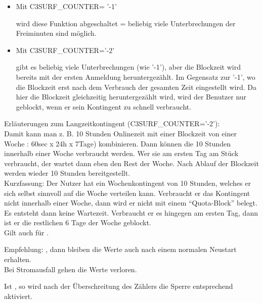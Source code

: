 \begin{itemize}
\begin{description}
\begin{itemize}
    \item{Mit C3SURF\_COUNTER= '-1'}
    
    wird diese Funktion abgeschaltet = beliebig viele Unterbrechungen der Freiminuten
    sind möglich.

    \item{Mit C3SURF\_COUNTER='-2'}
    
    gibt es beliebig viele Unterbrechungen (wie '-1'), aber die Blockzeit wird
    bereits mit der ersten Anmeldung heruntergezählt. Im Gegensatz zur '-1', wo die
    Blockzeit erst nach dem Verbrauch der gesamten Zeit eingestellt wird.
    Da hier die Blockzeit gleichzeitig heruntergezählt wird, wird der Benutzer nur geblockt,
    wenn er sein Kontingent zu schnell verbraucht.
  \end{itemize}
  
   Erläuterungen zum Langzeitkontingent (C3SURF\_COUNTER='-2'):\\
   Damit kann man z. B. 10 Stunden Onlinezeit  mit
   einer Blockzeit von einer Woche  : 60sec x 24h x 7Tage)
   kombinieren. Dann können die 10 Stunden innerhalb einer Woche verbraucht werden. Wer sie am ersten Tag am Stück 
   verbraucht, der wartet dann eben den Rest der Woche. Nach Ablauf der Blockzeit werden wieder 10 Stunden
   bereitgestellt.\\
   Kurzfassung: Der Nutzer hat ein Wochenkontingent von 10 Stunden, welches er sich selbst sinnvoll auf
   die Woche verteilen kann. Verbraucht er das Kontingent nicht innerhalb einer Woche, dann wird er nicht mit einem 
   ``Quota-Block'' belegt. Es entsteht dann keine Wartezeit. Verbraucht er es hingegen am ersten Tag, dann
   ist er die restlichen 6 Tage der Woche geblockt.\\
   Gilt auch für .
   
   Empfehlung: , dann bleiben die Werte auch nach einem
   normalen Neustart erhalten.\\
   Bei Stromausfall gehen die Werte verloren.
   
   Ist , so wird nach der Überschreitung des Zählers die
   Sperre entsprechend  aktiviert.



\end{description}
\end{itemize}
